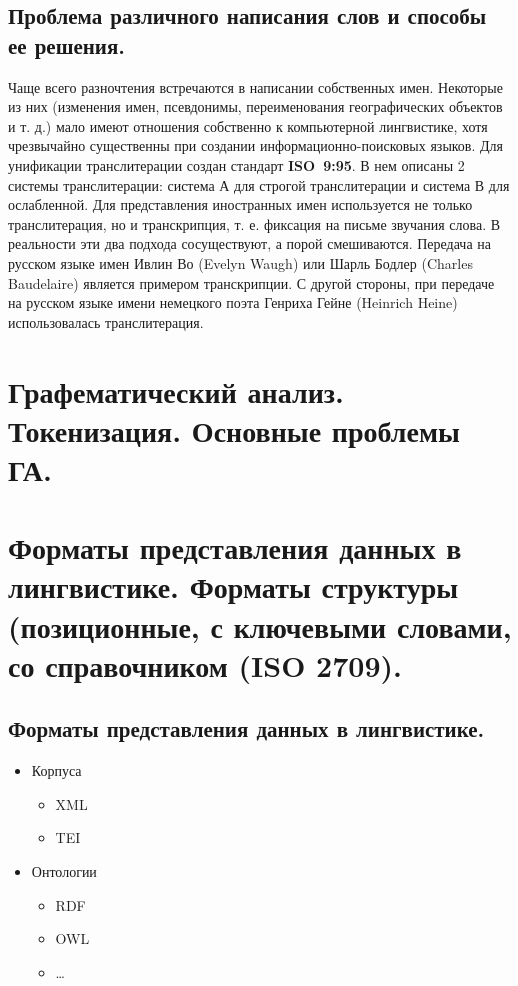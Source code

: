 \documentclass[12pt]{article}
\theoremstyle{definition}
\theoremstyle{remark}
\numberwithin{equation}{section}
\begin{document}
\subsection{Проблема различного написания слов и способы ее решения.}
Чаще всего разночтения встречаются в написании собственных имен. Некоторые из них (изменения имен, псевдонимы, переименования географических объектов и т. д.) мало имеют отношения собственно к компьютерной лингвистике, хотя чрезвычайно существенны при создании информационно\nobreakdash-поисковых языков.
Для унификации транслитерации создан стандарт \textbf{ISO~9:95}. В нем описаны 2 системы транслитерации: система А для строгой транслитерации и система В для ослабленной.
Для представления иностранных имен используется не только транслитерация, но и транскрипция, т. е. фиксация на письме звучания слова. В реальности эти два подхода сосуществуют, а порой смешиваются.
Передача на русском языке имен Ивлин Во (Evelyn Waugh) или Шарль Бодлер (Charles Baudelaire) является примером транскрипции. С другой стороны, при передаче на русском языке имени немецкого поэта Генриха Гейне (Heinrich Heine) использовалась транслитерация.

\section{Графематический анализ. Токенизация. Основные проблемы ГА.}

\section{Форматы представления данных в лингвистике. Форматы структуры (позиционные, с ключевыми словами, со справочником (ISO 2709).}
\subsection{Форматы представления данных в лингвистике.}
\begin{itemize}
\item Корпуса
\begin{itemize}
\item XML
\item TEI
\end{itemize}
\item Онтологии
\begin{itemize}
\item RDF
\item OWL
\item \dots
\end{itemize}
\end{itemize}
\end{document}
